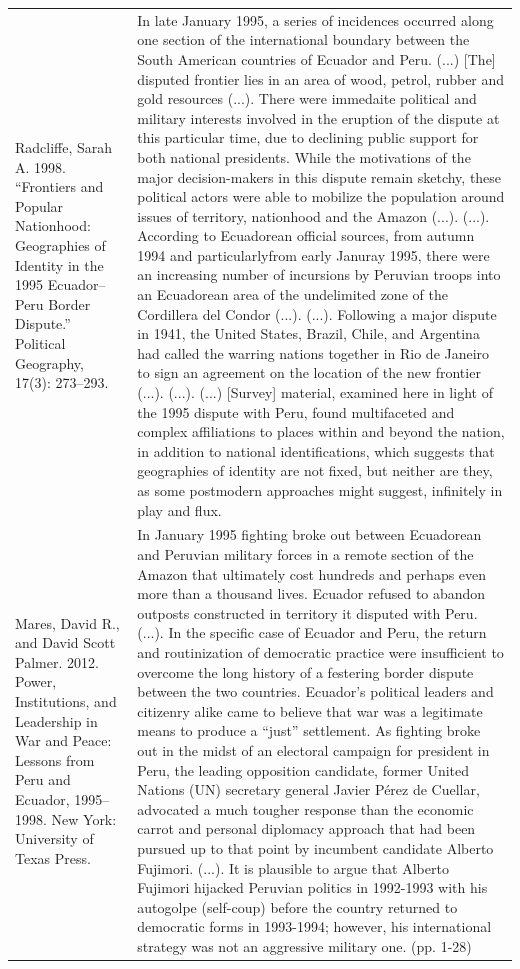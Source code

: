 {\begin{longtable}{p{}p{}}
\\
Radcliffe, Sarah A. 1998. “Frontiers and Popular Nationhood: Geographies of Identity in the 1995 Ecuador–Peru Border Dispute.” Political Geography, 17(3): 273–293. & In late January 1995, a series of incidences occurred along one section of the international boundary between the South American countries of Ecuador and Peru. (...) [The] disputed frontier lies in an area of wood, petrol, rubber and gold resources (...). There were immedaite political and military interests involved in the eruption of the dispute at this particular time, due to declining public support for both national presidents. While the motivations of the major decision-makers in this dispute remain sketchy, these political actors were able to mobilize the population around issues of territory, nationhood and the Amazon (...). (...). According to Ecuadorean official sources, from autumn 1994 and particularlyfrom early Januray 1995, there were an increasing number of incursions by Peruvian troops into an Ecuadorean area of the undelimited zone of the Cordillera del Condor (...). (...). Following a major dispute in 1941, the United States, Brazil, Chile, and Argentina had called the warring nations together in Rio de Janeiro to sign an agreement on the location of the new frontier (...). (...). 
(...) [Survey] material, examined here in light of the 1995 dispute with Peru, found multifaceted and complex affiliations to places within and beyond the nation, in addition to national identifications, which suggests that geographies of identity are not fixed, but neither are they, as some postmodern approaches might suggest, infinitely in play and flux. 
\\
Mares, David R., and David Scott Palmer. 2012. Power, Institutions, and Leadership in War and Peace: Lessons from Peru and Ecuador, 1995–1998. New York: University of Texas Press. & In January 1995 fighting broke out between Ecuadorean and Peruvian military forces in a remote section of the Amazon that ultimately cost hundreds and perhaps even more than a thousand lives. Ecuador refused to abandon outposts constructed in territory it disputed with Peru. (...). In the specific case of Ecuador and Peru, the return and routinization of democratic practice were insufficient to overcome the long history of a festering border dispute between the two countries. Ecuador's political leaders and citizenry alike came to believe that war was a legitimate means to produce a “just” settlement. As fighting broke out in the midst of an electoral campaign for president in Peru, the leading opposition candidate, former United Nations (UN) secretary general Javier Pérez de Cuellar, advocated a much tougher response than the economic carrot and personal diplomacy approach that had been pursued up to that point by incumbent candidate Alberto Fujimori. (...). It is plausible to argue that Alberto Fujimori hijacked Peruvian politics in 1992-1993 with his autogolpe (self-coup) before the country returned to democratic forms in 1993-1994; however, his international strategy was not an aggressive military one. (pp. 1-28)


\end{longtable}}
